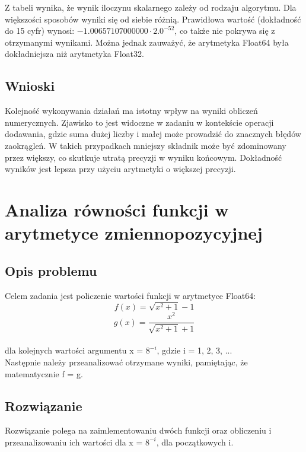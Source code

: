 \documentclass{article}
\begin{document}
Z tabeli wynika, że wynik iloczynu skalarnego zależy od rodzaju algorytmu. Dla większości sposobów wyniki się od siebie różnią. 
Prawidłowa wartość (dokładność do 15 cyfr) wynosi: $-1.00657107000000 \cdot 2.0^{-52}$, co także nie pokrywa się z otrzymanymi wynikami. Można jednak zauważyć, że arytmetyka Float64 była dokładniejsza niż arytmetyka Float32.
\subsection{Wnioski}
Kolejność wykonywania działań ma istotny wpływ na wyniki obliczeń numerycznych. Zjawisko to jest widoczne w zadaniu w kontekście operacji dodawania, gdzie suma dużej liczby i małej może prowadzić do znacznych błędów zaokrągleń. W takich przypadkach mniejszy składnik może być zdominowany przez większy, co skutkuje utratą precyzji w wyniku końcowym. Dokładność wyników jest lepsza przy użyciu arytmetyki o większej precyzji.
\section{Analiza równości funkcji w arytmetyce zmiennopozycyjnej}
\subsection{Opis problemu}
Celem zadania jest policzenie wartości funkcji w arytmetyce Float64:
\[
f(x) = \sqrt{x^2 + 1} - 1
\]
\[
g(x) = \frac{x^2}{\sqrt{x^2 + 1} + 1} 
\]
\\ dla kolejnych wartości argumentu x = $8^{-i}$, gdzie i = 1, 2, 3, ...
\\ Następnie należy przeanalizować otrzymane wyniki, pamiętając, że matematycznie f = g.
\subsection{Rozwiązanie}
Rozwiązanie polega na zaimlementowaniu dwóch funkcji oraz obliczeniu i przeanalizowaniu ich wartości dla x = $8^{-i}$, dla początkowych i.
\end{document}
